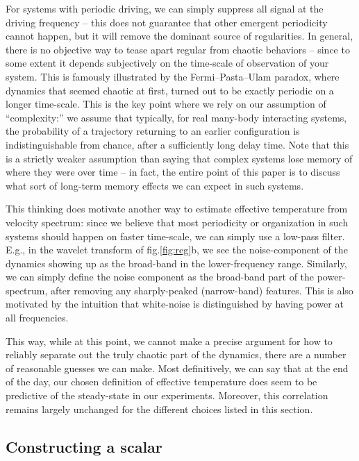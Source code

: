 \documentclass[reprint,prx]{revtex4-1}
\renewcommand{\=}[1]{\stackrel{#1}{=}} %
\renewcommand{\(}{\left (}
\renewcommand{\)}{\right  )}
\renewcommand{\[}{\left [}
\renewcommand{\]}{\right ]}
\newcommand{\<}{\left <}
\renewcommand{\>}{\right >}
\theoremstyle{definition}
\theoremstyle{remark}
\begin{document}
For systems with periodic driving, we can simply suppress all signal at the driving frequency -- this does not guarantee that other emergent periodicity cannot happen, but it will remove the dominant source of regularities. In general, there is no objective way to tease apart regular from chaotic behaviors -- since to some extent it depends subjectively on the time-scale of observation of your system.  This is famously illustrated by the Fermi–Pasta–Ulam paradox, where dynamics that seemed chaotic at first, turned out to be exactly periodic on a longer time-scale. This is the key point where we rely on our assumption of ``complexity:'' we assume that typically, for real many-body interacting systems, the probability of a trajectory returning to an earlier configuration is indistinguishable from chance, after a sufficiently long delay time. Note that this is a strictly weaker assumption than saying that complex systems lose memory of where they were over time -- in fact, the entire point of this paper is to discuss what sort of long-term memory effects we can expect in such systems. 

This thinking does motivate another way to estimate effective temperature from velocity spectrum: since we believe that most periodicity or organization in such systems should happen on faster time-scale, we can simply use a low-pass filter. E.g., in the wavelet transform of fig.\ref{fig:reg}b, we see the noise-component of the dynamics showing up as the broad-band in the lower-frequency range. Similarly, we can simply define the noise component as the broad-band part of the power-spectrum, after removing any sharply-peaked (narrow-band) features. This is also motivated by the intuition that white-noise is distinguished by having power at all frequencies. 

This way, while at this point, we cannot make a precise argument for how to reliably separate out the truly chaotic part of the dynamics, there are a number of reasonable guesses we can make. Most definitively, we can say that at the end of the day, our chosen definition of effective temperature does seem to be predictive of the steady-state in our experiments. Moreover, this correlation remains largely unchanged for the different choices listed in this section. 

\subsection{Constructing a scalar} \label{app:rattScalar}
\end{document}
